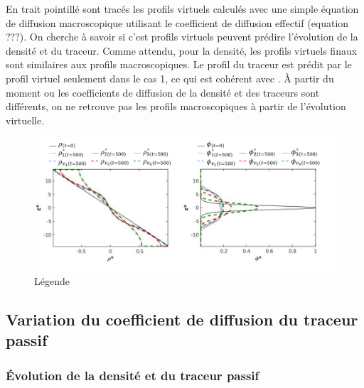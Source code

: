 \documentclass[a4paper,12pt]{article}
\begin{document}
    En trait pointillé sont tracés les profils virtuels calculés avec une simple équation de diffusion macroscopique utilisant le coefficient de diffusion effectif (equation ???). On cherche à savoir si c'est profils virtuels peuvent prédire l'évolution de la densité et du traceur. Comme attendu, pour la densité, les profils virtuels finaux sont similaires aux profils macroscopiques. Le profil du traceur est prédit par le profil virtuel seulement dans le cas 1, ce qui est cohérent avec \cite{penney_diapycnal_2020}. À partir du moment ou les coefficients de diffusion de la densité et des traceurs sont différents, on ne retrouve pas les profils macroscopiques à partir de l'évolution virtuelle. 
    
    \begin{figure}[!h]
        \centering
        \label{rhodiff_profils_Krho}
        \includegraphics[width=1\linewidth]{figures/rhodiff_profils_Krho.png}
        \caption{Légende}
    \end{figure}
    
    
  \subsection{Variation du coefficient de diffusion du traceur passif}
  
    \subsubsection{Évolution de la densité et du traceur passif}
    
\end{document}
